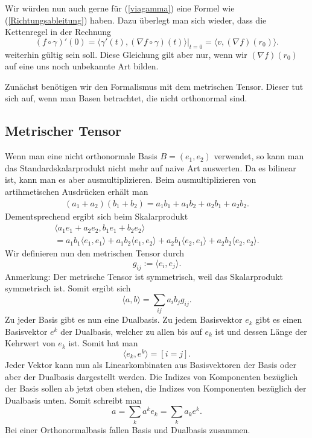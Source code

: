 \documentclass[a4paper,12pt,fleqn]{article}
\begin{document}
Wir würden nun auch gerne für (\ref{viagamma}) eine Formel
wie (\ref{Richtungsableitung}) haben. Dazu überlegt man sich wieder,
dass die Kettenregel in der Rechnung
\begin{equation}
(f\circ\gamma)'(0)
= \langle \gamma'(t),(\nabla f\circ\gamma)(t)\rangle\Big|_{t=0}
= \langle v,(\nabla f)(r_0)\rangle.
\end{equation}
weiterhin gültig sein soll. Diese Gleichung gilt aber nur,
wenn wir \((\nabla f)(r_0)\) auf eine uns noch unbekannte Art
bilden.

Zunächst benötigen wir den Formalismus mit dem metrischen Tensor.
Dieser tut sich auf, wenn man Basen betrachtet, die nicht
orthonormal sind.

\subsection{Metrischer Tensor}

Wenn man eine nicht orthonormale Basis \(B=(e_1,e_2)\) verwendet,
so kann man das Standardskalarprodukt nicht mehr auf naive Art
auswerten. Da es bilinear ist, kann man es aber ausmultiplizieren.
Beim ausmultiplizieren von artihmetischen Ausdrücken erhält man
\begin{gather*}
(a_1+a_2)(b_1+b_2)
= a_1b_1+a_1b_2+a_2b_1+a_2b_2.
\end{gather*}
Dementsprechend ergibt sich beim Skalarprodukt
\begin{gather*}
\langle a_1e_1+a_2e_2, b_1e_1+b_2e_2\rangle\\
= a_1b_1\langle e_1,e_1\rangle
+ a_1b_2\langle e_1,e_2\rangle
+ a_2b_1\langle e_2,e_1\rangle
+ a_2b_2\langle e_2,e_2\rangle.
\end{gather*}
Wir definieren nun den metrischen Tensor durch
\begin{equation}
g_{ij} := \langle e_i,e_j\rangle.
\end{equation}
Anmerkung: Der metrische Tensor ist symmetrisch, weil das
Skalarprodukt symmetrisch ist. Somit ergibt sich
\begin{equation}\label{SP}
\langle a,b\rangle =  \sum_{ij} a_ib_j g_{ij}.
\end{equation}
Zu jeder Basis gibt es nun eine Dualbasis. Zu jedem Basisvektor
\(e_k\) gibt es einen Basisvektor \(e^k\) der Dualbasis, welcher
zu allen bis auf \(e_k\) ist und dessen Länge der Kehrwert
von \(e_k\) ist. Somit hat man
\begin{equation}\label{dual}
\langle e_k,e^k\rangle = [i=j].
\end{equation}
Jeder Vektor kann nun als Linearkombinaten aus Basisvektoren
der Basis oder aber der Dualbasis dargestellt werden. Die Indizes
von Komponenten bezüglich der Basis sollen ab jetzt oben stehen,
die Indizes von Komponenten bezüglich der Dualbasis unten. Somit
schreibt man
\begin{equation}
a = \sum_k a^k e_k = \sum_k a_k e^k.
\end{equation}
Bei einer Orthonormalbasis fallen Basis und Dualbasis zusammen.
\end{document}
